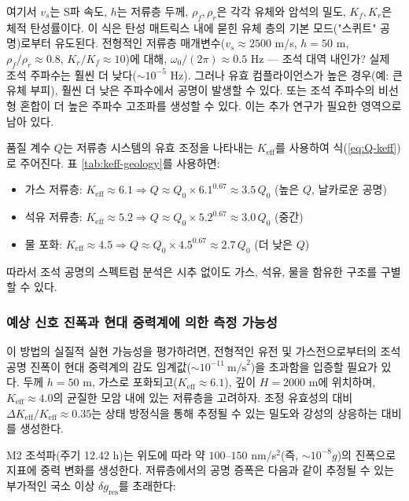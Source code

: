 \documentclass[12pt,a4paper]{article}
\theoremstyle{remark}
\newcommand{\Keff}{K_{\mathrm{eff}}}
\begin{document}
	여기서 \(v_s\)는 S파 속도, \(h\)는 저류층 두께, \(\rho_f, \rho_r\)은 각각 유체와 암석의 밀도, \(K_f, K_r\)은 체적 탄성률이다. 이 식은 탄성 매트릭스 내에 묻힌 유체 층의 기본 모드("스퀴트" 공명)로부터 유도된다. 전형적인 저류층 매개변수(\(v_s \approx 2500\) m/s, \(h = 50\) m, \(\rho_f/\rho_r \approx 0.8\), \(K_r/K_f \approx 10\))에 대해, \(\omega_0/(2\pi) \approx 0.5\) Hz — 조석 대역 내인가? 실제 조석 주파수는 훨씬 더 낮다(\(\sim 10^{-5}\) Hz). 그러나 유효 컴플라이언스가 높은 경우(예: 큰 유체 부피), 훨씬 더 낮은 주파수에서 공명이 발생할 수 있다. 또는 조석 주파수의 비선형 혼합이 더 높은 주파수 고조파를 생성할 수 있다. 이는 추가 연구가 필요한 영역으로 남아 있다.
	
	품질 계수 \(Q\)는 저류층 시스템의 유효 조정을 나타내는 \(\Keff\)를 사용하여 식(\ref{eq:Q-keff})로 주어진다. 표 \ref{tab:keff-geology}를 사용하면:
	
	\begin{itemize}
		\item 가스 저류층: \(\Keff \approx 6.1 \Rightarrow Q \approx Q_0 \times 6.1^{0.67} \approx 3.5\,Q_0\) (높은 \(Q\), 날카로운 공명)
		\item 석유 저류층: \(\Keff \approx 5.2 \Rightarrow Q \approx Q_0 \times 5.2^{0.67} \approx 3.0\,Q_0\) (중간)
		\item 물 포화: \(\Keff \approx 4.5 \Rightarrow Q \approx Q_0 \times 4.5^{0.67} \approx 2.7\,Q_0\) (더 낮은 \(Q\))
	\end{itemize}
	
	따라서 조석 공명의 스펙트럼 분석은 시추 없이도 가스, 석유, 물을 함유한 구조를 구별할 수 있다.
	
	\subsubsection{예상 신호 진폭과 현대 중력계에 의한 측정 가능성}
	\label{subsubsec:signal_amplitude}
	
	이 방법의 실질적 실현 가능성을 평가하려면, 전형적인 유전 및 가스전으로부터의 조석 공명 진폭이 현대 중력계의 감도 임계값(\( \sim 10^{-11}\ \text{m/s}^2\))을 초과함을 입증할 필요가 있다. 두께 \(h = 50\) m, 가스로 포화되고(\(\Keff \approx 6.1\)), 깊이 \(H = 2000\) m에 위치하며, \(\Keff \approx 4.0\)의 균질한 모암 내에 있는 저류층을 고려하자. 조정 유효성의 대비 \(\Delta \Keff / \Keff \approx 0.35\)는 상태 방정식을 통해 추정될 수 있는 밀도와 강성의 상응하는 대비를 생성한다.
	
	M2 조석파(주기 12.42 h)는 위도에 따라 약 \(100\)–\(150\) nm/s\(^2\)(즉, \(\sim 10^{-8} g\))의 진폭으로 지표에 중력 변화를 생성한다. 저류층에서의 공명 증폭은 다음과 같이 추정될 수 있는 부가적인 국소 이상 \(\delta g_{\text{res}}\)를 초래한다:
	
\end{document}
